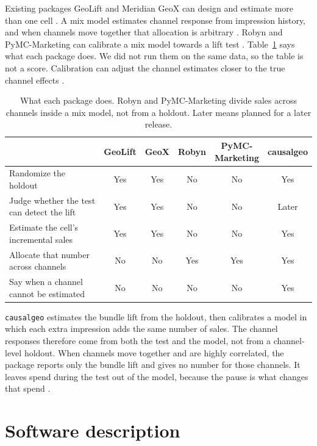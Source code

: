 \documentclass[preprint,12pt]{elsarticle}
\begin{document}
Existing packages GeoLift and Meridian GeoX can design and estimate more than one cell \cite{geolift,geox2026}. A mix model estimates channel response from impression history, and when channels move together that allocation is arbitrary \cite{chanperry2017,jin2017}. Robyn and PyMC-Marketing can calibrate a mix model towards a lift test \cite{runge2024,pymcmarketing2024}. Table~\ref{tab:packages} says what each package does. We did not run them on the same data, so the table is not a score. Calibration can adjust the channel estimates closer to the true channel effects \cite{zhang2023}.
\begin{table}[t]
\centering
\caption{What each package does. Robyn and PyMC-Marketing divide sales across channels inside a mix model, not from a holdout. Later means planned for a later release.}
\label{tab:packages}
\footnotesize
\setlength{\tabcolsep}{3pt}
\begin{tabular}{>{\raggedright\arraybackslash}p{4.6cm}ccccc}
\toprule
 & GeoLift & GeoX & Robyn & \shortstack{PyMC-\\Marketing} & causalgeo \\
\midrule
Randomize the holdout & Yes & Yes & No & No & Yes \\
Judge whether the test can detect the lift & Yes & Yes & No & No & Later \\
Estimate the cell's incremental sales & Yes & Yes & No & No & Yes \\
Allocate that number across channels & No & No & Yes & Yes & Yes \\
Say when a channel cannot be estimated & No & No & No & No & Yes \\
\bottomrule
\end{tabular}
\end{table}

\texttt{causalgeo} estimates the bundle lift from the holdout, then calibrates a model in which each extra impression adds the same number of sales. The channel responses therefore come from both the test and the model, not from a channel-level holdout. When channels move together and are highly correlated, the package reports only the bundle lift and gives no number for those channels. It leaves spend during the test out of the model, because the pause is what changes that spend \cite{angrist2009}.

\section{Software description}
\label{sec:software}
\end{document}
